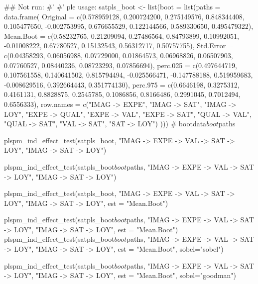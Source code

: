 \documentclass[a4paper]{book}
\begin{document}
\begin{Examples}
\begin{ExampleCode}

## Not run: 
#'
#'
ple usage:
  satpls_boot <- list(boot = list(paths = data.frame(
    Original = c(0.578959128, 0.200724200, 0.275149576, 0.848344408,
                 0.105477650, -0.002753995, 0.676655529, 0.122144566, 0.589330650, 0.495479322),
    Mean.Boot = c(0.58232765, 0.21209094, 0.27486564, 0.84793899,
                  0.10992051, -0.01008222, 0.67780527, 0.15132543, 0.56312717, 0.50757755),
    Std.Error = c(0.04358293, 0.06056988, 0.07729000, 0.01864573,
                  0.06968826, 0.06507903, 0.07760527, 0.08440236, 0.08723293, 0.07856694),
    perc.025 = c(0.497644719, 0.107561558, 0.140641502, 0.815794494,
                 -0.025566471, -0.147788188, 0.519959683, -0.008629516, 0.392664443, 0.351774130),
    perc.975 = c(0.6646198, 0.3275312, 0.4161131, 0.8828875,
                 0.2545785, 0.1086856, 0.8166486, 0.2991045, 0.7012494, 0.6556333),
    row.names = c("IMAG -> EXPE", "IMAG -> SAT", "IMAG -> LOY",
                  "EXPE -> QUAL", "EXPE -> VAL", "EXPE -> SAT",
                  "QUAL -> VAL", "QUAL -> SAT", "VAL -> SAT", "SAT -> LOY")
  )))
  # bootdata$boot$paths




  plspm_ind_effect_test(satpls_boot,
                      "IMAG -> EXPE -> VAL -> SAT -> LOY",
                      "IMAG -> SAT -> LOY")

  plspm_ind_effect_test(satpls_boot$boot$paths,
                        "IMAG -> EXPE -> VAL -> SAT -> LOY",
                        "IMAG -> SAT -> LOY")

  plspm_ind_effect_test(satpls_boot,
                      "IMAG -> EXPE -> VAL -> SAT -> LOY",
                      "IMAG -> SAT -> LOY", est = "Mean.Boot")

  plspm_ind_effect_test(satpls_boot$boot$paths,
                        "IMAG -> EXPE -> VAL -> SAT -> LOY",
                        "IMAG -> SAT -> LOY", est = "Mean.Boot")
  plspm_ind_effect_test(satpls_boot$boot$paths,
                        "IMAG -> EXPE -> VAL -> SAT -> LOY",
                        "IMAG -> SAT -> LOY",
                        est = "Mean.Boot",
                        sobel="sobel")

  plspm_ind_effect_test(satpls_boot$boot$paths,
                        "IMAG -> EXPE -> VAL -> SAT -> LOY",
                        "IMAG -> SAT -> LOY",
                        est = "Mean.Boot",
                        sobel="goodman")



\end{ExampleCode}
\end{Examples}
\end{document}
